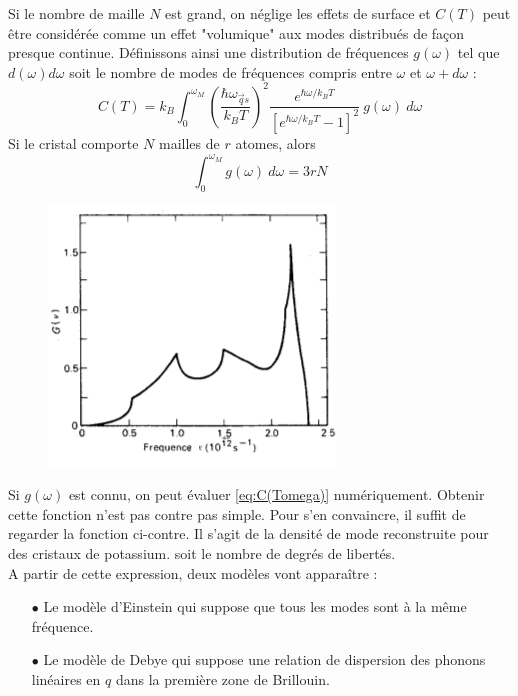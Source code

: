 Si le nombre de maille $N$ est grand, on néglige les effets de surface et 
$C(T)$ peut être considérée comme un effet "volumique" aux modes distribués 
de façon presque continue. Définissons ainsi une distribution de fréquences
$g(\omega)$ tel que $d(\omega)d\omega$ soit le nombre de modes de fréquences 
compris entre $\omega$ et $\omega+d\omega$ :
\begin{equation}
C(T) = k_B\int_0^{\omega_M}\left(\dfrac{\hbar 
\omega_{\vec{q}s}}{k_BT}\right)^2\dfrac{e^{\hbar\omega/k_BT}}{
\left[e^{\hbar\omega/k_BT}-1\right]^2}\ g(\omega)\ d\omega
\label{eq:C(Tomega)}
\end{equation}
Si le cristal comporte $N$ mailles de $r$ atomes, alors
\begin{equation}
\int_0^{\omega_M} g(\omega)\ d\omega = 3rN
\end{equation}
	\begin{figure}
	\vspace{-0.5cm}
	\includegraphics[scale=0.4]{ch7/image1.png}
	\end{figure}
Si $g(\omega)$ est connu, on peut évaluer \autoref{eq:C(Tomega)} numériquement. 
Obtenir cette fonction n'est pas contre pas simple. Pour s'en convaincre, il 
suffit de regarder la fonction ci-contre. Il s'agit de la densité de mode 
reconstruite pour des cristaux de potassium.
soit le nombre de degrés de libertés.\\
A partir de cette expression, deux modèles vont apparaître :
\begin{itemize}
\item[$\bullet$] Le modèle d'Einstein qui suppose que tous les modes sont à
la même fréquence.
\item[$\bullet$] Le modèle de Debye qui suppose une relation de dispersion 
des phonons linéaires en $q$ dans la première zone de Brillouin.
\end{itemize}



